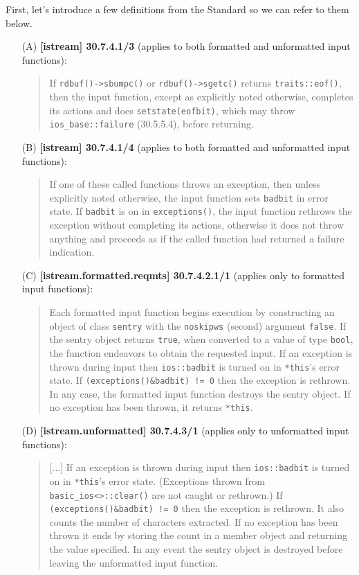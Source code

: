 \documentclass{wg21}
\newcommand{\cc}[1]{\texttt{#1}}
\begin{document}
First, let's introduce a few definitions from the Standard so we can refer to
them below.

\begin{enumerate}
  \item[(A)] \textbf{[istream] 30.7.4.1/3} (applies to both formatted and unformatted input functions):
  \begin{quote}
  If \cc{rdbuf()->sbumpc()} or \cc{rdbuf()->sgetc()} returns \cc{traits::eof()},
  then the input function, except as explicitly noted otherwise, completes its
  actions and does \cc{setstate(eofbit)}, which may throw \cc{ios_base::failure}
  (30.5.5.4), before returning.
  \end{quote}

  \item[(B)] \textbf{[istream] 30.7.4.1/4} (applies to both formatted and unformatted input functions):
  \begin{quote}
  If one of these called functions throws an exception, then unless explicitly
  noted otherwise, the input function sets \cc{badbit} in error state. If
  \cc{badbit} is on in \cc{exceptions()}, the input function rethrows the
  exception without completing its actions, otherwise it does not throw
  anything and proceeds as if the called function had returned a failure
  indication.
  \end{quote}

  \item[(C)] \textbf{[istream.formatted.reqmts] 30.7.4.2.1/1} (applies only to formatted input functions):
  \begin{quote}
  Each formatted input function begins execution by constructing an object of
  class \cc{sentry} with the \cc{noskipws} (second) argument \cc{false}. If
  the sentry object returns \cc{true}, when converted to a value of type
  \cc{bool}, the function endeavors to obtain the requested input. If an exception
  is thrown during input then \cc{ios::badbit} is turned on in \cc{*this}'s error
  state. If \cc{(exceptions()&badbit) != 0} then the exception is rethrown. In
  any case, the formatted input function destroys the sentry object. If no
  exception has been thrown, it returns \cc{*this}.
  \end{quote}

  \item[(D)] \textbf{[istream.unformatted] 30.7.4.3/1} (applies only to unformatted input functions):
  \begin{quote}
  [...] If an exception is thrown during input then \cc{ios::badbit} is turned
  on in \cc{*this}'s error state. (Exceptions thrown from \cc{basic_ios<>::clear()}
  are not caught or rethrown.) If \cc{(exceptions()&badbit) != 0} then the
  exception is rethrown. It also counts the number of characters extracted.
  If no exception has been thrown it ends by storing the count in a member
  object and returning the value specified. In any event the sentry object
  is destroyed before leaving the unformatted input function.
  \end{quote}
\end{enumerate}
\end{document}
